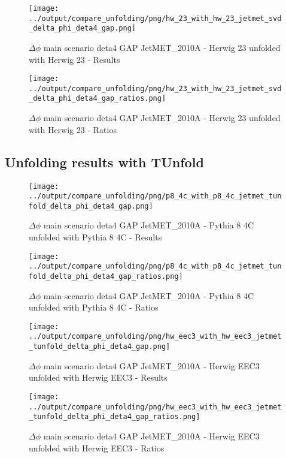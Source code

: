 \documentclass[11pt]{book}
\begin{document}
\begin{figure}[ht]
\centering
\texttt{[image: ../output/compare\_unfolding/png/hw\_23\_with\_hw\_23\_jetmet\_svd\_delta\_phi\_deta4\_gap.png]}
\caption{$\Delta\phi$ main scenario deta4 GAP JetMET\_2010A - Herwig 23 unfolded with Herwig 23 - Results}
\label{hw_23_hw_23_jetmet_svd_delta_phi_deta4_gap_a}
\end{figure}

\begin{figure}[ht]
\centering
\texttt{[image: ../output/compare\_unfolding/png/hw\_23\_with\_hw\_23\_jetmet\_svd\_delta\_phi\_deta4\_gap\_ratios.png]}
\caption{$\Delta\phi$ main scenario deta4 GAP JetMET\_2010A - Herwig 23 unfolded with Herwig 23 - Ratios}
\label{hw_23_hw_23_jetmet_svd_delta_phi_deta4_gap_b}
\end{figure}


\clearpage
\subsection{Unfolding results with TUnfold}

\begin{figure}[ht]
\centering
\texttt{[image: ../output/compare\_unfolding/png/p8\_4c\_with\_p8\_4c\_jetmet\_tunfold\_delta\_phi\_deta4\_gap.png]}
\caption{$\Delta\phi$ main scenario deta4 GAP JetMET\_2010A - Pythia 8 4C unfolded with Pythia 8 4C - Results}
\label{p8_p8_jetmet_tunfold_delta_phi_deta4_gap_a}
\end{figure}

\begin{figure}[ht]
\centering
\texttt{[image: ../output/compare\_unfolding/png/p8\_4c\_with\_p8\_4c\_jetmet\_tunfold\_delta\_phi\_deta4\_gap\_ratios.png]}
\caption{$\Delta\phi$ main scenario deta4 GAP JetMET\_2010A - Pythia 8 4C unfolded with Pythia 8 4C - Ratios}
\label{p8_p8_jetmet_tunfold_delta_phi_deta4_gap_b}
\end{figure}

\begin{figure}[ht]
\centering
\texttt{[image: ../output/compare\_unfolding/png/hw\_eec3\_with\_hw\_eec3\_jetmet\_tunfold\_delta\_phi\_deta4\_gap.png]}
\caption{$\Delta\phi$ main scenario deta4 GAP JetMET\_2010A - Herwig EEC3 unfolded with Herwig EEC3 - Results}
\label{hw_eec3_hw_eec3_jetmet_tunfold_delta_phi_deta4_gap_a}
\end{figure}

\begin{figure}[ht]
\centering
\texttt{[image: ../output/compare\_unfolding/png/hw\_eec3\_with\_hw\_eec3\_jetmet\_tunfold\_delta\_phi\_deta4\_gap\_ratios.png]}
\caption{$\Delta\phi$ main scenario deta4 GAP JetMET\_2010A - Herwig EEC3 unfolded with Herwig EEC3 - Ratios}
\label{hw_eec3_hw_eec3_jetmet_tunfold_delta_phi_deta4_gap_b}
\end{figure}
\end{document}
